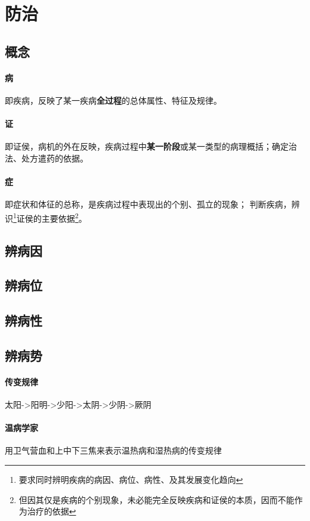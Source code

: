 \section{防治}

\subsection{概念}
\paragraph{病} 即疾病，反映了某一疾病\textbf{全过程}的总体属性、特征及规律。
\paragraph{证} 即证侯，病机的外在反映，疾病过程中\textbf{某一阶段}或某一类型的病理概括；确定治法、处方遣药的依据。
\paragraph{症}
即症状和体征的总称，是疾病过程中表现出的个别、孤立的现象；
判断疾病，辨识\footnote{要求同时辨明疾病的病因、病位、病性、及其发展变化趋向}证侯的主要依据\footnote{但因其仅是疾病的个别现象，未必能完全反映疾病和证侯的本质，因而不能作为治疗的依据}。

\subsection{辨病因}

\subsection{辨病位}

\subsection{辨病性}

\subsection{辨病势}
\paragraph{传变规律}太阳->阳明->少阳->太阴->少阴->厥阴
\paragraph{温病学家}用卫气营血和上中下三焦来表示温热病和湿热病的传变规律
